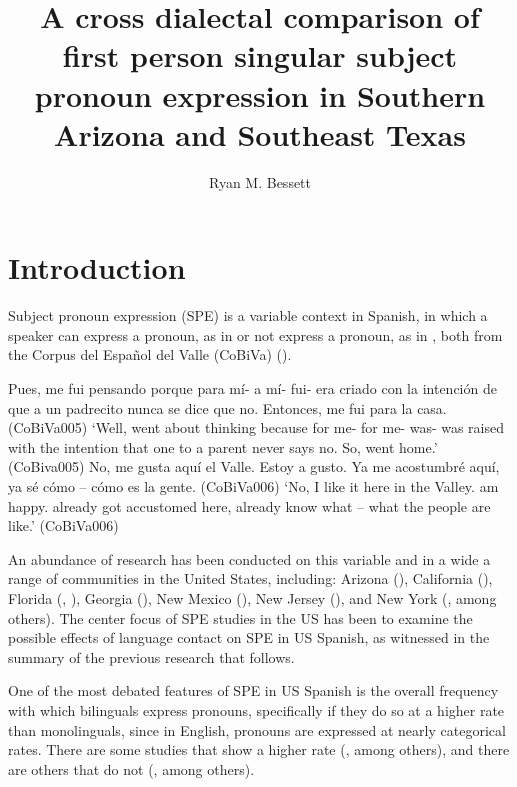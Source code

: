 \documentclass[output=paper]{langscibook}
\author{Ryan M. Bessett\orcid{}\affiliation{University of Texas Rio Grande Valley}}
\title[First person singular subject pronoun expression in Arizona and Texas]
	  {A cross dialectal comparison of first person singular subject pronoun expression in Southern Arizona and Southeast Texas}
\begin{document}
\maketitle 

\section{Introduction}\label{sec:aztx:1}
Subject pronoun expression (SPE) is a variable context in Spanish, in which a speaker can express a pronoun, as in  or not express a pronoun, as in , both from the Corpus del Español del Valle (CoBiVa) (\citealt{ChristoffersenBessett2019}).\largerpage

\ea\label{ex:aztx:1}Pues,  me fui pensando porque para mí- a mí-  fui-  era criado con la intención de que a un padrecito nunca se dice que no. Entonces,  me fui para la casa. (CoBiVa005)\pagebreak
 \glt ‘Well,  went about thinking because for me- for me-  was-  was raised with the intention that one to a parent never says no. So,  went home.’ (CoBiva005)
\ex\label{ex:aztx:2}No, me gusta aquí el Valle. {} Estoy a gusto. Ya me {} acostumbré aquí, ya {} sé cómo – cómo es la gente. (CoBiVa006)
 \glt ‘No, I like it here in the Valley. {} am happy. {} already got accustomed here, {} already know what – what the people are like.’ (CoBiVa006)
\z 

\begin{sloppypar}
An abundance of research has been conducted on this variable and in a wide a range of communities in the United States, including: Arizona (\citealt{Cerrón-Palomino2016, Bessett2018}), California (\citealt{Silva-Corvalán1994, BayleyPease-Alvarez1997}), Florida (\citealt{Hurtado2001}, \citealt{Abreu2009}), Georgia (\citealt{Limerick2017}), New Mexico (\citealt{TorresCacoullosTravis2010a,TorresCacoullosTravis2010b}), New Jersey (\citealt{Flores-Ferrán2007}), and New York (\citealt{Flores-Ferrán2004, OtheguyLivert2007, OtheguyZentella2012}, among others). The center focus of SPE studies in the US has been to examine the possible effects of language contact on SPE in US Spanish, as witnessed in the summary of the previous research that follows.
\end{sloppypar}


One of the most debated features of SPE in US Spanish is the overall frequency with which bilinguals express pronouns, specifically if they do so at a higher rate than monolinguals, since in English, pronouns are expressed at nearly categorical rates. There are some studies that show a higher rate (\citealt{LapidusOtheguy2005, OtheguyLivert2007, OtheguyZentella2012}, among others), and there are others that do not (\citealt{Silva-Corvalán1994, BayleyPease-Alvarez1997, Hurtado2001, Flores-Ferrán2004,Flores-Ferrán2007, TorresCacoullosTravis2010b, TorresCacoullosTravis2010a, Cerrón-Palomino2016, Limerick2017, Bessett2018}, among others).
\end{document}
